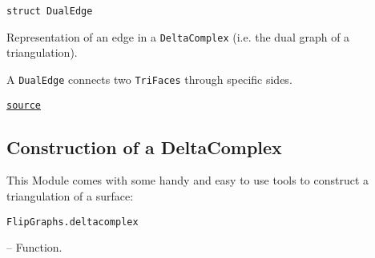 \begin{adjustwidth}{2em}{0pt}


\begin{verbatim}
struct DualEdge
\end{verbatim}

Representation of an edge in a \texttt{DeltaComplex} (i.e. the dual graph of a triangulation).

A \texttt{DualEdge} connects two \texttt{TriFaces} through specific sides.



\href{https://github.com/schto223/FlipGraphs.jl/blob/e35d43698a06b86273148826b79d585ba04fcd26/src/deltaComplex.jl#L4-L10}{\texttt{source}}


\end{adjustwidth}

\subsection{Construction of a DeltaComplex}



\label{9718644995923369106}{}


This Module comes with some handy and easy to use tools to construct a triangulation of a surface:


\hypertarget{5812016659056946666}{\texttt{FlipGraphs.deltacomplex}}  -- {Function.}

